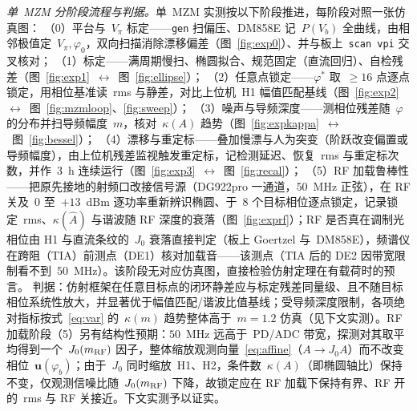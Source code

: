 \documentclass[11pt,journal,onecolumn]{IEEEtran}
\theoremstyle{plain}
\theoremstyle{remark}
\newcommand{\uv}{\mathbf{u}}
\begin{document}
\emph{单~MZM 分阶段流程与判据。}单~MZM 实测按以下阶段推进，每阶段对照一张仿真图：
（0）平台与~$V_\pi$ 标定——\texttt{gen} 扫偏压、DM858E 记~$P(V_b)$ 全曲线，由相邻极值定~$V_\pi,\varphi_0$，双向扫描消除漂移偏差（图~\ref{fig:exp0}）、并与板上~\texttt{scan vpi} 交叉核对；
（1）标定——满周期慢扫、椭圆拟合、规范固定（直流回归）、自检残差（图~\ref{fig:exp1}~$\leftrightarrow$~图~\ref{fig:ellipse}）；
（2）任意点锁定——$\varphi^\ast$ 取~$\ge16$ 点逐点锁定，用相位基准读~rms 与静差，对比上位机~H1 幅值匹配基线（图~\ref{fig:exp2}~$\leftrightarrow$~图~\ref{fig:mzmloop}、\ref{fig:sweep}）；
（3）噪声与导频深度——测相位残差随~$\varphi$ 的分布并扫导频幅度~$m$，核对~$\kappa(A)$ 趋势（图~\ref{fig:expkappa}~$\leftrightarrow$~图~\ref{fig:bessel}）；
（4）漂移与重定标——叠加慢漂与人为突变（阶跃改变偏置或导频幅度），由上位机残差监视触发重定标，记检测延迟、恢复~rms 与重定标次数，并作~$3$~h 连续运行（图~\ref{fig:exp3}~$\leftrightarrow$~图~\ref{fig:recal}）；
（5）RF 加载鲁棒性——把原先接地的射频口改接信号源（DG922pro 一通道，$50$~MHz 正弦），在 RF 关及~$0$ 至~$+13$~dBm 逐功率重新辨识椭圆、于~$8$ 个目标相位逐点锁定，记录锁定~rms、$\kappa(\hat A)$ 与谐波随 RF 深度的衰落（图~\ref{fig:exprf}）；RF 是否真在调制光相位由 H1 与直流条纹的~$J_0$ 衰落直接判定（板上 Goertzel 与~DM858E），频谱仪在跨阻（TIA）前测点（DE1）核对加载音——该测点（TIA 后的 DE2 因带宽限制看不到~$50$~MHz）。该阶段无对应仿真图，直接检验仿射定理在有载荷时的预言。
判据：仿射框架在任意目标点的闭环静差应与标定残差同量级、且不随目标相位系统性放大，并显著优于幅值匹配/谐波比值基线；受导频深度限制，各项绝对指标按式~\eqref{eq:var} 的~$\kappa(m)$ 趋势整体高于~$m{=}1.2$ 仿真（见下文实测）。RF 加载阶段（5）另有结构性预期：$50$~MHz 远高于~PD/ADC 带宽，探测对其取平均得到一个~$J_0(m_{\rm RF})$ 因子，整体缩放观测向量~\eqref{eq:affine}（$A\to J_0A$）而不改变相位~$\uv(\varphi_b)$；由于~$J_0$ 同时缩放~H1、H2，条件数~$\kappa(A)$（即椭圆轴比）保持不变，仅观测信噪比随~$J_0(m_{\rm RF})$ 下降，故锁定应在 RF 加载下保持有界、RF 开的~rms 与 RF 关接近。下文实测予以证实。
\end{document}

